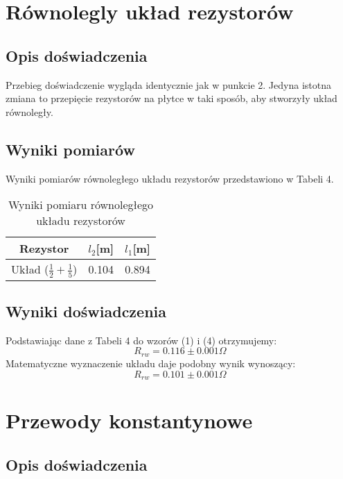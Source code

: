 \documentclass{article} %
\begin{document}
\section{Równolegly układ rezystorów}


\subsection{Opis doświadczenia}

Przebieg doświadczenie wygląda identycznie jak w punkcie 2. Jedyna istotna zmiana to przepięcie rezystorów na płytce w taki sposób, aby stworzyły układ równoległy.

\subsection{Wyniki pomiarów}

Wyniki pomiarów równoległego układu rezystorów przedstawiono w Tabeli 4.

\begin{table}[h!]
\centering
\begin{tabular}{|c|c|c|}
\hline
\textbf{Rezystor} & \textbf{$l_2$[m]} & \textbf{$l_1$[m]} \\
\hline
 Układ ($\frac{1}{2}+\frac{1}{5}$) & 0.104 & 0.894 \\
\hline
\end{tabular}
\caption{Wyniki pomiaru równoległego układu rezystorów}
\label{table:students}
\end{table}

\subsection{Wyniki doświadczenia}
Podstawiając dane z Tabeli 4 do wzorów (1) i (4) otrzymujemy:
{\large
\begin{equation}
    R_{rw} = 0.116\pm0.001\Omega
\end{equation}
}
Matematyczne wyznaczenie układu daje podobny wynik wynoszący:
{\large
\begin{equation}
    R_{rw} = 0.101\pm0.001\Omega
\end{equation}
}
\section{Przewody konstantynowe}

\subsection{Opis doświadczenia}
\end{document}

